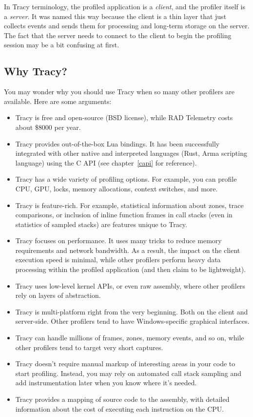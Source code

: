 \documentclass[hidelinks,titlepage,a4paper]{article}
\begin{document}
In Tracy terminology, the profiled application is a \emph{client}, and the profiler itself is a \emph{server}. It was named this way because the client is a thin layer that just collects events and sends them for processing and long-term storage on the server. The fact that the server needs to connect to the client to begin the profiling session may be a bit confusing at first.

\subsection{Why Tracy?}

You may wonder why you should use Tracy when so many other profilers are available. Here are some arguments:

\begin{itemize}
\item Tracy is free and open-source (BSD license), while RAD Telemetry costs about \$8000 per year.
\item Tracy provides out-of-the-box Lua bindings. It has been successfully integrated with other native and interpreted languages (Rust, Arma scripting language) using the C API (see chapter~\ref{capi} for reference).
\item Tracy has a wide variety of profiling options. For example, you can profile CPU, GPU, locks, memory allocations, context switches, and more.
\item Tracy is feature-rich. For example, statistical information about zones, trace comparisons, or inclusion of inline function frames in call stacks (even in statistics of sampled stacks) are features unique to Tracy.
\item Tracy focuses on performance. It uses many tricks to reduce memory requirements and network bandwidth. As a result, the impact on the client execution speed is minimal, while other profilers perform heavy data processing within the profiled application (and then claim to be lightweight).
\item Tracy uses low-level kernel APIs, or even raw assembly, where other profilers rely on layers of abstraction.
\item Tracy is multi-platform right from the very beginning. Both on the client and server-side. Other profilers tend to have Windows-specific graphical interfaces.
\item Tracy can handle millions of frames, zones, memory events, and so on, while other profilers tend to target very short captures.
\item Tracy doesn't require manual markup of interesting areas in your code to start profiling. Instead, you may rely on automated call stack sampling and add instrumentation later when you know where it's needed.
\item Tracy provides a mapping of source code to the assembly, with detailed information about the cost of executing each instruction on the CPU.
\end{itemize}
\end{document}
